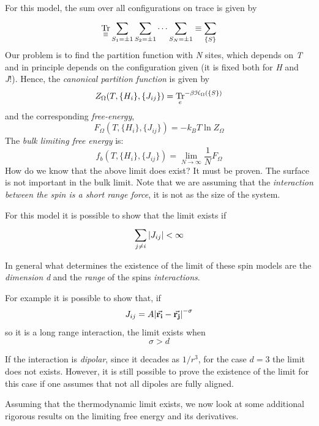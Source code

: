\documentclass[../../Main/Main.tex]{subfiles}
\begin{document}
For this model, the sum over all configurations on trace is given by
\begin{equation*}
  \underset{\equiv}{\text{Tr}} \sum_{S_1 = \pm 1}^{}  \sum_{S_2 = \pm 1}^{}  \dots \sum_{S_N = \pm 1}^{} \equiv \sum_{\{ S \}  }^{}
\end{equation*}
 Our problem is to find the partition function with \emph{N} sites, which depends on \emph{T} and in principle depends on the configuration given (it is fixed both for \emph{H} and \emph{J}!).
Hence, the \emph{canonical partition function} is given by
\begin{equation}
  Z_{\Omega } (T, \{ H_i \}, \{ J_{ij} \}    ) = \underset{e}{\text{Tr}}^{-\beta \mathcal{H}_ \Omega ( \{ S \}  )}
\end{equation}
and the corresponding \emph{free-energy},
\begin{equation}
  F_ \Omega  (T, \{ H_i \}, \{ J_{ij} \} ) = - k_B T \ln{Z_ \Omega }
\end{equation}
The \emph{bulk limiting free energy} is:
\begin{equation}
  f_b (T, \{ H_i \}, \{ J_{ij} \} ) = \lim_{N \rightarrow \infty }\frac{1}{N}  F_ \Omega  
\end{equation}
How do we know that the above limit does exist? It must be proven. The surface is not important in the bulk limit.
 Note that we are assuming that the \emph{interaction between the spin is a short range force}, it is not as the size of the system.

For this model it is possible to show that the limit exists if
\begin{equation}
  \sum_{j \neq i}^{} \abs{J_{ij}} < \infty
\end{equation}
\begin{remark}
In general what determines the existence of the limit of these spin models are the \emph{dimension} \emph{d} and the \emph{range} of the spins \emph{interactions}.
\end{remark}
For example it is possible to show that, if
\begin{equation}
  J_{ij} = A \abs{\va{r_i}-\va{r_j}  }^{-\sigma}
\end{equation}
so it is a long range interaction, the limit exists when
\begin{equation*}
  \sigma > d
\end{equation*}
\begin{remark}
If the interaction is \emph{dipolar}, since it decades as \( 1/r^3 \), for the case \( d=3 \) the limit does not exists. However, it is still possible to prove the existence of the limit for this case if one assumes that not all dipoles are fully aligned.
\end{remark}
Assuming that the thermodynamic limit exists, we now look at some additional rigorous results on the limiting free energy and its derivatives.
\end{document}
